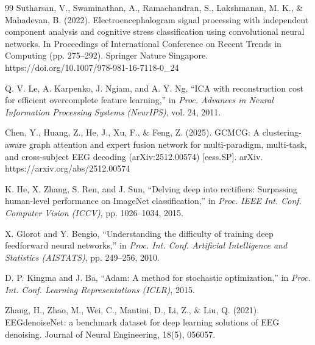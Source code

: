 \documentclass{article}
\begin{document}
\begin{thebibliography}{99}
Sutharsan, V., Swaminathan, A., Ramachandran, S., Lakshmanan, M. K., $\&$ Mahadevan, B. (2022). Electroencephalogram signal processing with independent component analysis and cognitive stress classification using convolutional neural networks. In Proceedings of International Conference on Recent Trends in Computing (pp. 275–292). Springer Nature Singapore. https://doi.org/10.1007/978-981-16-7118-0\_24

Q. V. Le, A. Karpenko, J. Ngiam, and A. Y. Ng, ``ICA with reconstruction cost for efficient overcomplete feature learning,'' in \textit{Proc. Advances in Neural Information Processing Systems (NeurIPS)}, vol. 24, 2011.

Chen, Y., Huang, Z., He, J., Xu, F., $\&$ Feng, Z. (2025). GCMCG: A clustering-aware graph attention and expert fusion network for multi-paradigm, multi-task, and cross-subject EEG decoding (arXiv:2512.00574) [eess.SP]. arXiv. https://arxiv.org/abs/2512.00574

K. He, X. Zhang, S. Ren, and J. Sun, ``Delving deep into rectifiers: Surpassing human-level performance on ImageNet classification,'' in \textit{Proc. IEEE Int. Conf. Computer Vision (ICCV)}, pp. 1026--1034, 2015.

X. Glorot and Y. Bengio, ``Understanding the difficulty of training deep feedforward neural networks,'' in \textit{Proc. Int. Conf. Artificial Intelligence and Statistics (AISTATS)}, pp. 249--256, 2010.

D. P. Kingma and J. Ba, ``Adam: A method for stochastic optimization,'' in \textit{Proc. Int. Conf. Learning Representations (ICLR)}, 2015.

Zhang, H., Zhao, M., Wei, C., Mantini, D., Li, Z., $\&$ Liu, Q. (2021). EEGdenoiseNet: a benchmark dataset for deep learning solutions of EEG denoising. Journal of Neural Engineering, 18(5), 056057.

\end{thebibliography}
\end{document}
